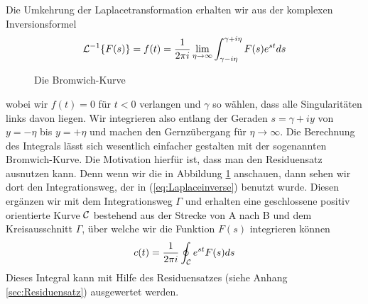 Die Umkehrung der Laplacetransformation erhalten wir aus der komplexen
Inversionsformel
\begin{equation}\label{eq:Laplaceinverse}
  {\cal L}^{-1}\{F(s)\}=f(t)=\frac{1}{2\pi i}\lim_{\eta\rightarrow\infty}
\int_{\gamma-i\eta}^{\gamma+i\eta} F(s) e^{st}ds
\end{equation}
%
\begin{figure}[ht]
\centering
{}
\caption{\label{fig:Bromwich}Die Bromwich-Kurve}
\end{figure}
wobei wir $f(t)=0$ für $t<0$ verlangen und $\gamma$ so wählen, dass alle
Singularitäten links davon liegen. Wir integrieren also entlang der Geraden
$s=\gamma+iy$ von $y=-\eta$ bis $y=+\eta$ und machen den Gernzübergang für
$\eta\rightarrow\infty$. Die Berechnung des Integrals lässt sich wesentlich
einfacher gestalten mit der sogenannten Bromwich-Kurve. Die Motivation hierfür
ist, dass man den Residuensatz ausnutzen kann. Denn wenn wir die in Abbildung
\ref{fig:Bromwich} anschauen, dann sehen wir dort den Integrationsweg, der in
(\ref{eq:Laplaceinverse}) benutzt wurde. Diesen ergänzen wir mit dem
Integrationsweg $\Gamma$ und erhalten eine geschlossene positiv orientierte
Kurve $\cal C$ bestehend aus der Strecke von A nach B und dem Kreisausschnitt
$\Gamma$, über welche wir die Funktion $F(s)$ integrieren können
\begin{equation}\label{eq:Kreisintegral}
c(t)=\frac{1}{2\pi i}\oint_{\cal C}e^{st}F(s)ds
\end{equation}
Dieses Integral kann mit Hilfe des Residuensatzes (siehe Anhang \ref{sec:Residuensatz}) ausgewertet werden.  
